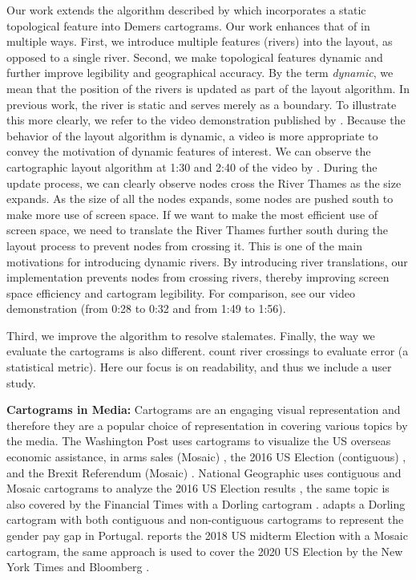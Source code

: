 \documentclass[Afour,sagev,times]{sagej}
\newcommand{\bobgraph}[1]{\noindent\textbf{#1}}
\begin{document}
Our work extends the algorithm described by \citet{tong2018Cartograms} which incorporates a static topological feature into Demers cartograms.
Our work enhances that of \citet{tong2018Cartograms} in multiple ways.
First, we introduce multiple features (rivers) into the layout, as opposed to a single river.
Second, we make topological features dynamic and further improve legibility and geographical accuracy.
By the term \textit{dynamic}, we mean that the position of the rivers is updated as part of the layout algorithm.
In previous work, the river is static and serves merely as a boundary.
To illustrate this more clearly, we refer to the video demonstration published by \citet{tong2018Cartograms}. Because the behavior of the layout algorithm is dynamic, a video is more appropriate to convey the motivation of dynamic features of interest.
We can observe the cartographic layout algorithm at 1:30 and 2:40 of the video by \citet{tong2018Cartograms}.
During the update process, we can clearly observe nodes cross the River Thames as the size expands.
As the size of all the nodes expands, some nodes are pushed south to make more use of screen space.
If we want to make the most efficient use of screen space, we need to translate the River Thames further south during the layout process to prevent nodes from crossing it.
This is one of the main motivations for introducing dynamic rivers. 
By introducing river translations, our implementation prevents nodes from crossing rivers, thereby improving screen space efficiency and cartogram legibility.
For comparison, see our video demonstration (from 0:28 to 0:32 and from 1:49 to 1:56)\footnotemark{}.


Third, we improve the algorithm to resolve stalemates.
Finally, the way we evaluate the cartograms is also different.
\citet{tong2018Cartograms} count river crossings to evaluate error (a statistical metric).
Here our focus is on readability, and thus we include a user study.

\bobgraph{Cartograms in Media: }Cartograms are an engaging visual representation and therefore they are a popular choice of representation in covering various topics by the media.
The Washington Post uses cartograms to visualize the US overseas economic assistance, in arms sales (Mosaic) \cite{bearak2016Everything}, the 2016 US Election (contiguous) \cite{gamio2016Election}, and the Brexit Referendum (Mosaic) \cite{taylor2016What}.
National Geographic uses contiguous and Mosaic cartograms to analyze the 2016 US Election results \cite{miller2016Election}, the same topic is also covered by the Financial Times with a Dorling cartogram \cite{stabe2016Search}.
\citet{cruz2017Adapted} adapts a Dorling cartogram with both contiguous and non-contiguous cartograms to represent the gender pay gap in Portugal.
\citet{sandberg2018Cartogram} reports the 2018 US midterm Election with a Mosaic cartogram, the same approach is used to cover the 2020 US Election by the New York Times \cite{thelearningnetwork2020What} and Bloomberg \cite{mccartney20202020}.
\end{document}

